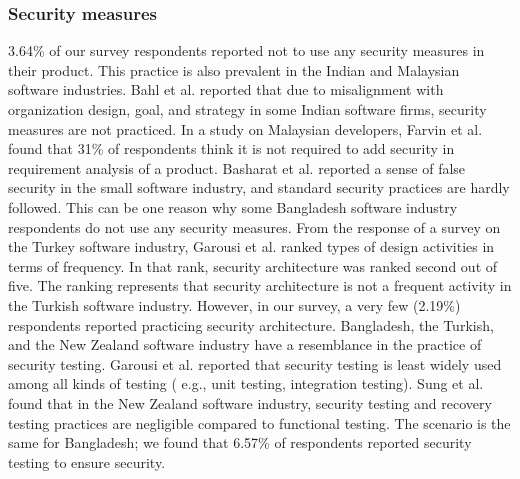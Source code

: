 \subsubsection{Security measures}
\label{security_comparison}

3.64\% of our survey respondents reported not to use any security measures in their product. This practice is also prevalent in the Indian and Malaysian software industries. Bahl et al.\cite{Bahl2011} reported that due to misalignment with organization design, goal, and strategy in some Indian software firms, security measures are not practiced. In a study on  Malaysian developers, Farvin et al.\cite{Farvin2016} found that 31\% of respondents think it is not required to add security in requirement analysis of a product. Basharat et al.\cite{Basharat2013} reported a sense of false security in the small software industry, and standard security practices are hardly followed. This can be one reason why some Bangladesh software industry respondents do not use any security measures.  From the response of a survey on the Turkey software industry, Garousi et al.\cite{Garousi2015} ranked types of design activities in terms of frequency. In that rank, security architecture was ranked second out of five. The ranking represents that security architecture is not a frequent activity in the Turkish software industry. However, in our survey, a very few (2.19\%) respondents reported practicing security architecture.  Bangladesh, the Turkish, and the New Zealand software industry have a resemblance in the practice of security testing. Garousi et al.\cite{Garousi2015} reported that security testing is least widely used among all kinds of testing ( e.g., unit testing, integration testing). Sung et al.\cite{Sung2006} found that in the New Zealand software industry, security testing and recovery testing practices are negligible compared to functional testing. The scenario is the same for Bangladesh; we found that 6.57\% of respondents reported security testing to ensure security.


